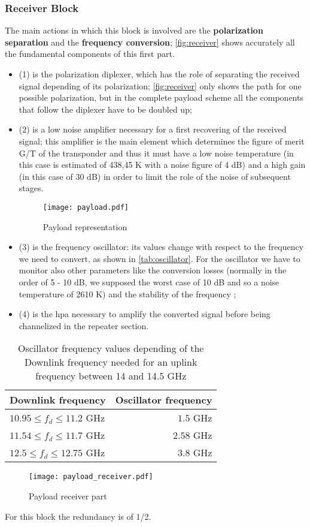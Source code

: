\subsubsection{Receiver Block}
The main actions in which this block is involved are the \textbf{polarization separation} and the \textbf{frequency conversion}; \autoref{fig:receiver} shows accurately all the fundamental components of this first part.
\begin{itemize}
\item (1) is the polarization diplexer, which has the role of separating the received signal depending of its polarization; \autoref{fig:receiver} only shows the path for one possible polarization, but in the complete payload scheme all the components that follow the diplexer have to be doubled up;
\item (2) is a low noise amplifier necessary for a first recovering of the received signal; this amplifier is the main element which determines the figure of merit G/T of the transponder and thus it must have a low noise temperature (in this case is estimated of 438,45 K with a noise figure of 4 dB) and a high gain (in this case of 30 dB) in order to limit the role of the noise of subsequent stages.
\begin{sidewaysfigure}
\centering
\texttt{[image: payload.pdf]}
\caption{Payload representation}
\label{fig:payload}
\end{sidewaysfigure}
\item (3) is the frequency oscillator: its values change with respect to the frequency we need to convert, as shown in \autoref{tab:oscillator}. For the oscillator we have to monitor also other parameters like the conversion losses (normally in the order of 5 - 10 dB, we supposed the worst case of 10 dB and so a noise temperature of 2610 K) and the stability of the frequency \cite{Maral2017};
\item (4) is the \gls{hpa} necessary to amplify the converted signal before being channelized in the repeater section.
\end{itemize}
	\begin{table}
	\centering
	\begin{tabular}{lr}
	\toprule
	Downlink frequency & Oscillator frequency\\
	\midrule
	$10.95 \leq f_d \leq 11.2$ GHz & $1.5$ GHz\\
	$11.54 \leq f_d \leq 11.7$ GHz & $2.58$ GHz\\
	$12.5 \leq f_d \leq 12.75$ GHz & $3.8$ GHz\\
	\bottomrule
	\end{tabular}
	\caption{Oscillator frequency values depending of the Downlink frequency needed for an uplink frequency between 14 and 14.5 GHz}
	\label{tab:oscillator}
\end{table}
\begin{figure}[h]
	\centering
	\texttt{[image: payload\_receiver.pdf]}
	\caption{Payload receiver part}
	\label{fig:receiver}
\end{figure}
For this block the redundancy is of 1/2.

